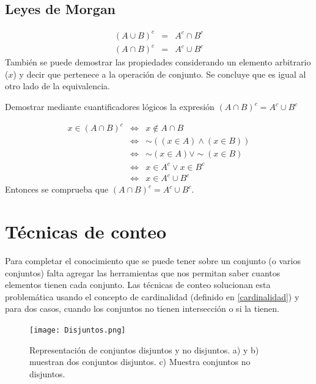 \subsection{Leyes de Morgan}
\begin{eqnarray}
(A\cup B)^{c}&=& A^{c}\cap B^{c}\\
(A\cap B)^{c}&=& A^{c}\cup B^{c}
\end{eqnarray}
También se puede demostrar las propiedades considerando un elemento arbitrario ($x$) y decir que pertenece a la operación de conjunto. Se concluye que es igual al otro lado de la equivalencia.

\begin{myexample} 
Demostrar mediante cuantificadores lógicos la expresión $(A\cap B)^{c}=A^{c}\cup B^{c}$
\end{myexample}

\begin{eqnarray}
x\in (A\cap B)^{c} &\Leftrightarrow & x\notin A\cap B \nonumber\\
&\Leftrightarrow & \sim ((x\in A)\wedge(x\in B))\nonumber\\
&\Leftrightarrow &\sim (x\in A)\vee\sim(x\in B)\nonumber\\
&\Leftrightarrow & x\in A^{c} \vee x\in B^{c}\nonumber\\
&\Leftrightarrow & x\in A^{c}\cup B^{c}\nonumber
\end{eqnarray}
Entonces se comprueba que $(A\cap B)^{c}=A^{c}\cup B^{c}$.


\section{Técnicas de conteo}
Para completar el conocimiento que se puede tener sobre un conjunto (o varios conjuntos) falta agregar las herramientas que nos permitan saber cuantos elementos tienen cada conjunto. Las técnicas de conteo solucionan esta problemática usando el concepto de cardinalidad (definido en \ref{cardinalidad}) y para dos casos, cuando los conjuntos no tienen intersección o si la tienen.

\begin{center}
	\begin{figure}[h!]
	\centering
		\texttt{[image: Disjuntos.png]}
		\caption[Representación de conjuntos disjuntos y no disjuntos]{Representación de conjuntos disjuntos y no disjuntos. a) y b) muestran dos conjuntos disjuntos. c) Muestra conjuntos no disjuntos. }
		\label{disjuntos}
	\end{figure}
\end{center}

